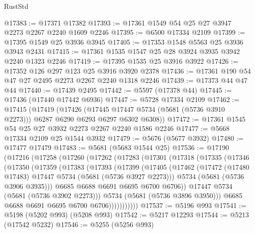 \begin{lexlean}{RustStd}
\begin{coremodule}
@17383 := @17371 @17382
@17393 := @17361 @1549 @54 @25 @27 @3947 @2273 @2267 @2240 @1609 @2246
@17395 := @6500 @17334 @2109
@17399 := @17395 @1549 @25 @3936 @3945
@17405 := @17353 @1548 @5563 @25 @3936 @3943 @2431
@17415 := @17361 @1535 @1547 @25 @28 @3924 @3935 @3942 @2240 @1323 @2246
@17419 := @17395 @1535 @25 @3916 @3922
@17426 := @17352 @126 @297 @123 @25 @3916 @3920 @2378
@17436 := @17361 @190 @54 @47 @27 @2495 @2273 @2267 @2240 @1318 @2246
@17439 := @17373 @44 @47 @44
@17440 := @17439 @2495
@17442 := @5597 (@17378 @44)
@17445 := @17436 (@17440 @17442 @6936)
@17447 := @5728 @17334 @2109
@17462 := @17415
    (@17419
      (@17426
        (@17445 @17447 @5734 (@5681 (@5736 @3910 @2273)))
        @6287
        @6290
        @6293
        @6297
        @6302
        @6308))
@17472 := @17361 @1545 @54 @25 @27 @3932 @2273 @2267 @2240 @1586 @2246
@17477 := @5668 @17334 @2109 @25 @1544 @3932
@17479 := @5676 (@5677 @3932)
@17480 := @17477 @17479
@17483 := @5681 (@5683 @1544 @25)
@17536 := @17190
    (@17216
      (@17258
        (@17260
          (@17262
            (@17283
              (@17301
                (@17318
                  (@17335
                    (@17346
                      (@17350
                        (@17359
                          (@17383
                            (@17393
                              (@17399
                                (@17405
                                  (@17462
                                    (@17472
                                      (@17480 @17483)
                                      @17447
                                      @5734
                                      (@5681 (@5736 @3927 @2273)))
                                    @5734
                                    (@5681 (@5736 @3906 @3935)))
                                  @6685
                                  @6688
                                  @6691
                                  @6695
                                  @6700
                                  @6706))
                              @17447
                              @5734
                              (@5681 (@5736 @3902 @2273)))
                            @5734
                            (@5681 (@5736 @3896 @3950)))
                          @6685
                          @6688
                          @6691
                          @6695
                          @6700
                          @6706)))))))))))
@17537 := @5196 @993
@17541 := @5198 (@5202 @993) (@5208 @993)
@17542 := @5217 @12293
@17544 := @5213 (@17542 @5232)
@17546 := @5255 (@5256 @993)

\end{coremodule}
\end{lexlean}
